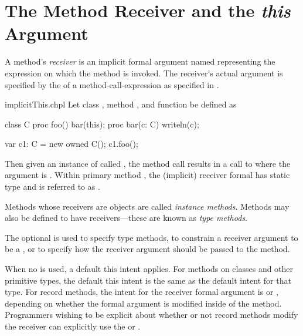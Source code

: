 \section{The Method Receiver and the {\em this} Argument}
\label{Method_receiver_and_this}

A method's \emph{receiver} is an implicit formal argument
named  representing the expression on which the method is
invoked.  The receiver's actual argument is specified by the
 of a method-call-expression as specified
in .




\begin{chapelexample}{implicitThis.chpl}
Let class , method , and function  be
defined as
\begin{chapel}
class C {
  proc foo() {
    bar(this);
  }
}
proc bar(c: C) { writeln(c); }
\end{chapel}
\begin{chapelpost}
var c1: C = new owned C();
c1.foo();
\end{chapelpost}
\begin{chapeloutput}
{}
\end{chapeloutput}
Then given an instance of  called , the method
call  results in a call to  where the
argument is .  Within primary method , the
(implicit) receiver formal has static type  and is referred to
as .
\end{chapelexample}

Methods whose receivers are objects are called \emph{instance
methods}.  Methods may also be defined to have 
receivers---these are known as \emph{type methods}.

The optional  is used to specify type methods, to
constrain a receiver argument to be a , or to specify how
the receiver argument should be passed to the method.

When no  is used, a default this intent applies. For
methods on classes and other primitive types, the default this intent is
the same as the default intent for that type.
For record methods, the intent for the receiver formal argument is 
or , depending on whether the formal argument is modified
inside of the method. Programmers wishing to be explicit about whether or
not record methods modify the receiver can explicitly use the 
or  .

